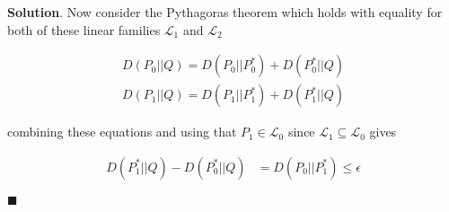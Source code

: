 \documentclass[12pt]{article}
\theoremstyle{definition}
\newenvironment{s}{%
        \begin{trivlist} \item \textbf{Solution}. }{%
            \hspace*{\fill} $\blacksquare$\end{trivlist}}%
\begin{document}
{\begin{s}
Now consider the Pythagoras theorem which holds with equality for both of these linear families $\mathcal{L}_{1}$ and $\mathcal{L}_{2}$

\begin{align*}
D(P_{0}||Q) = D(P_{0}||P_{0}^{*}) + D(P_{0}^{*}||Q)
\end{align*}
\begin{align*}
D(P_{1}||Q) = D(P_{1}||P_{1}^{*}) + D(P_{1}^{*}||Q)
\end{align*}

combining these equations and using that $P_{1} \in \mathcal{L}_{0}$ since $ \mathcal{L}_{1} \subseteq  \mathcal{L}_{0}$ gives

\begin{align*}
D(P_{1}^{*}||Q) - D(P_{0}^{*}||Q)  &= D(P_{0}||P_{1}^{*}) \leq \epsilon
\end{align*}

\end{s}
\end{document}
